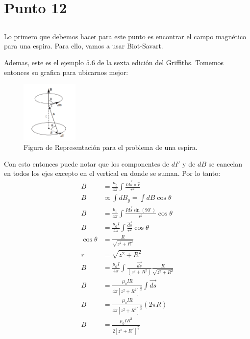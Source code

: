 \documentclass{report}
\begin{document}
\chapter{Punto 12}

\section{}

Lo primero que debemos hacer para este punto es encontrar el campo magnético para una espira. Para ello, vamos a usar Biot-Savart.


Ademas, este es el ejemplo $5.6$ de la sexta edición del Griffiths. Tomemos entonces su grafica para ubicarnos mejor:

\begin{figure}[h]
	\begin{center}
		\includegraphics[width=0.25\textwidth]{img/book_5_21.png}
	\end{center}
	\caption{Figura de Representación para el problema de una espira.}\label{fig:Fig_5_21}
\end{figure}

Con esto entonces puede notar que los componentes de $d I'$ y de $d B$ se cancelan en todos los ejes excepto en el vertical en donde se suman. Por lo tanto:
\begin{align*}
	B &= \frac{\mu_0}{4\pi} \int \frac{I \vec{d s} \times \hat{r}}{r^2}\\
	B &\propto \int d B_y = \int dB \cos\theta\\
	B &= \frac{\mu_0}{4\pi} \int \frac{I \vec{d s} \sin\left(90^{\circ}\right)}{r^2}\cos\theta\\
	B &= \frac{\mu_0 I}{4\pi} \int \frac{\vec{d s}}{r^2}\cos\theta\\
	\cos\theta &= \frac{R}{\sqrt{z^2 + R^2}}\\
	r &= \sqrt{z^2 + R^2}\\
	B &= \frac{\mu_0 I}{4\pi} \int \frac{\vec{d s}}{\left(z^2 + R^2\right)}\frac{R}{\sqrt{z^2 + R^2}}\\
	B &= \frac{\mu_0 I R}{4\pi \left[ z^2 + R^2\right]^{\frac{3}{2}}} \int \vec{d s}\\
	B &= \frac{\mu_0 I R}{4\pi \left[ z^2 + R^2\right]^{\frac{3}{2}}} \left( 2\pi R\right)\\
	B &= \frac{\mu_0 I R^2}{2\left[ z^2 + R^2\right]^{\frac{3}{2}}}\\
\end{align*}
\end{document}
